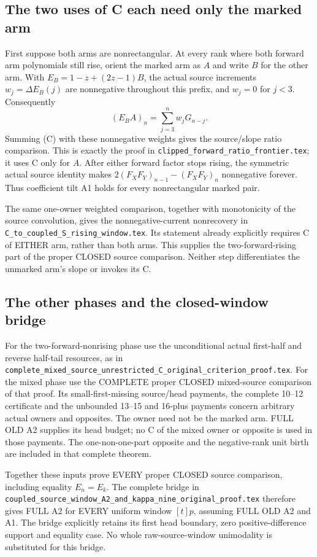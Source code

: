 \subsection{The two uses of C each need only the marked arm}
First suppose both arms are nonrectangular. At every rank where both
forward arm polynomials still rise, orient the marked arm as $A$ and
write $B$ for the other arm. With $E_B=1-z+(2z-1)B$, the actual source
increments $w_j=\Delta E_B(j)$ are nonnegative throughout this prefix,
and $w_j=0$ for $j<3$. Consequently
\[
 (E_BA)_n=\sum_{j=3}^n w_jG_{n-j}.
\]
Summing (C) with these nonnegative weights gives the source/slope
ratio comparison. This is exactly the proof in
\texttt{clipped\_forward\_ratio\_frontier.tex}; it uses C only for $A$.
After either forward factor stops rising, the symmetric actual source
identity makes $2(F_XF_Y)_{n-1}-(F_XF_Y)_n$ nonnegative forever.
Thus coefficient tilt A1 holds for every nonrectangular marked pair.

The same one-owner weighted comparison, together with monotonicity of
the source convolution, gives the nonnegative-current nonrecovery
in \texttt{C\_to\_coupled\_S\_rising\_window.tex}. Its statement already
explicitly requires C of EITHER arm, rather than both arms. This supplies
the two-forward-rising part of the proper CLOSED source comparison.
Neither step differentiates the unmarked arm's slope or invokes its C.

\subsection{The other phases and the closed-window bridge}
For the two-forward-nonrising phase use the unconditional actual
first-half and reverse half-tail resources, as in
\texttt{complete\_mixed\_source\_unrestricted\_C\_original\_criterion\_proof.tex}.
For the mixed phase use the COMPLETE proper CLOSED mixed-source
comparison of that proof. Its small-first-missing source/head payments,
the complete 10--12 certificate and the unbounded 13--15 and 16-plus
payments concern arbitrary actual owners and opposites. The owner
need not be the marked arm. FULL OLD A2 supplies its head budget;
no C of the mixed owner or opposite is used in those payments.
The one-non-one-part opposite and the negative-rank unit birth are
included in that complete theorem.

Together these inputs prove EVERY proper CLOSED source comparison,
including equality $E_n=E_k$. The complete bridge in
\texttt{coupled\_source\_window\_A2\_and\_kappa\_nine\_original\_proof.tex}
therefore gives FULL A2 for EVERY uniform window $[t]p$, assuming
FULL OLD A2 and A1. The bridge explicitly retains its first head
boundary, zero positive-difference support and equality case. No
whole raw-source-window unimodality is substituted for this bridge.

